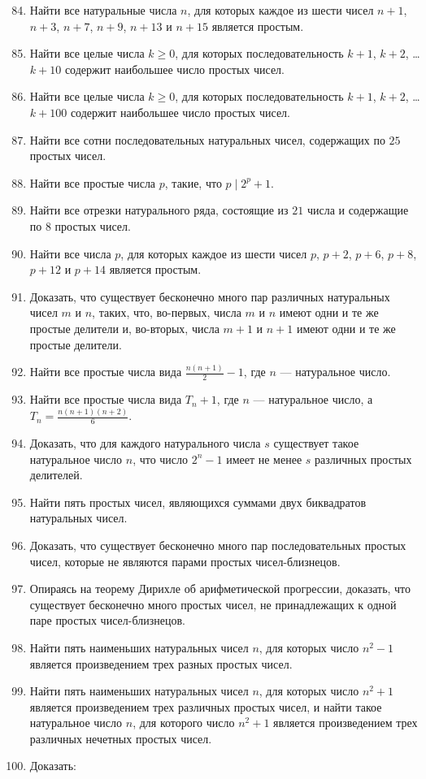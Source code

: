 \documentclass[12pt, a4paper, openany]{book}
\begin{document}
\begin{enumerate}
	\setcounter{enumi}{83}
	\item Найти все натуральные числа $n$, для которых каждое из шести чисел $n+1$, $n+3$, $n+7$, $n+9$, $n+13$ и $n+15$ является простым.
	\item Найти все целые числа $k \geqslant  0$, для которых последовательность $k+1$, $k+2$, \ldots $k+10$ содержит наибольшее число простых чисел.
	\item Найти все целые числа $k \geqslant  0$, для которых последовательность $k+1$, $k+2$, \ldots $k+100$ содержит наибольшее число простых чисел.
	\item Найти все сотни последовательных натуральных чисел, содержащих по $25$ простых чисел.
	\item Найти все простые числа $p$, такие, что $p \mid 2^p + 1$.
	\item Найти все отрезки натурального ряда, состоящие из $21$ числа и содержащие по $8$ простых чисел.
	\item Найти все числа $p$, для которых каждое из шести чисел $p$, $p+2$, $p+6$, $p+8$, $p+12$ и $p+14$ является простым.
	\item Доказать, что существует бесконечно много пар различных натуральных чисел $m$ и $n$, таких, что, во-первых, числа $m$ и $n$ имеют одни	и те же простые делители и, во-вторых, числа $m+1$ и $n+1$ имеют одни и те же простые делители.
	\item Найти все простые числа вида $\displaystyle \frac{n(n+1)}{2}-1$, где $n$ — натуральное число.
	\item Найти все простые числа вида $T_n + 1$, где $n$ — натуральное число, а $\displaystyle T_n = \frac{n(n+1)(n+2)}{6}$.
	\item Доказать, что для каждого натурального числа $s$ существует такое натуральное число $n$, что число $2^n - 1$ имеет не менее $s$ различных простых делителей.
	\item Найти пять простых чисел, являющихся суммами двух биквадратов натуральных чисел.
	\item Доказать, что существует бесконечно много пар последовательных простых чисел, которые не являются парами простых чисел-близнецов.
	\item Опираясь на теорему Дирихле об арифметической прогрессии, доказать, что существует бесконечно много простых чисел, не принадлежащих к одной паре простых чисел-близнецов.
	\item Найти пять наименьших натуральных чисел $n$, для которых число $n^2 - 1$ является произведением трех разных простых чисел.
	\item Найти пять наименьших натуральных чисел $n$, для которых число $n^2 + 1$ является произведением трех различных простых чисел, и найти такое натуральное число $n$, для которого число $n^2 + 1$ является произведением трех различных нечетных простых чисел.
	\item Доказать:
	

\end{enumerate}
\end{document}
